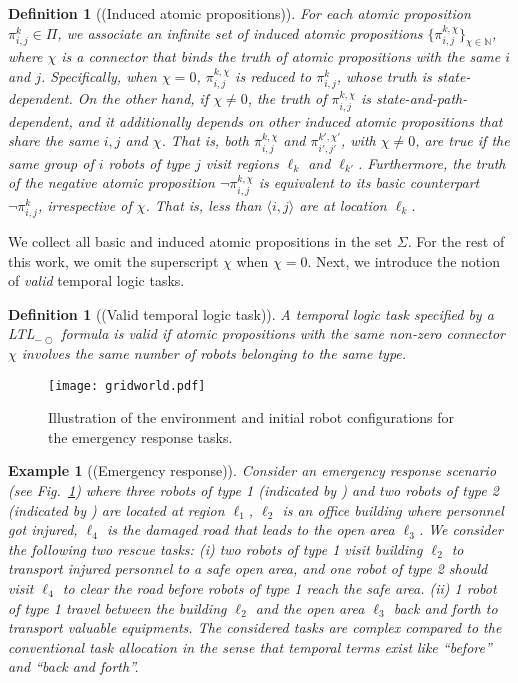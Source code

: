 \documentclass[Afour,sageh,times]{sagej}
\newtheorem{exmp}{Example}
\newtheorem{defn}[thm]{Definition}
\newcommand{\ltl}{ {\it LTL}$_{-\bigcirc}$ }
\newcommand{\ag}[2]{\langle#1,#2\rangle}
\renewcommand{\ap}[3]{\mathcal{\pi}_{{#1},{#2}}^{#3}}
\newlength\myheight
\newlength\mydepth
\newcommand*\inlinegraphics[1]{%
  \settototalheight\myheight{Xygp}%
  \settodepth\mydepth{Xygp}%
  \raisebox{-0.7\mydepth}{\texttt{[image: \#1]}}%
}
\begin{document}
\begin{defn}[(Induced atomic propositions)]
   For each atomic proposition $\ap{i}{j}{k} \in \Pi$, we associate an infinite set of  {induced} atomic propositions $\{\ap{i}{j}{k,\chi}\}_{\chi\in \mathbb{N}}$, where $\chi$ is a {\it connector} that binds the truth of  atomic propositions with the same $i$ and $j$. Specifically, when $\chi=0$, $\ap{i}{j}{k,\chi}$ is reduced to $\ap{i}{j}{k}$, whose truth is state-dependent. On the other hand, if $\chi \neq 0$, the truth of $\ap{i}{j}{k,\chi}$ is state-and-path-dependent, and it additionally depends on other induced atomic propositions that share the same $i,j$ and $\chi$. That is, both $\ap{i}{j}{k,\chi}$ and $\ap{i'}{j'}{k',\chi'}$, with $\chi\not=0$, are true if the same group of $i$ robots of type $j$ visit regions $\ell_k$ and $\ell_{k'}$. Furthermore, the truth of the negative atomic proposition  $\neg \ap{i}{j}{k,\chi}$ is equivalent to its basic counterpart $\neg \ap{i}{j}{k}$, irrespective of  $\chi$. That is, less than $\ag{i}{j}$ are at location $\ell_k$.
\end{defn}
We collect all basic and induced atomic propositions in the set $\Sigma$.  For the rest of this work, we omit the superscript $\chi$ when $\chi=0$. Next, we introduce the notion of {\it valid} temporal logic tasks.
 \begin{defn}[(Valid temporal logic task)]\label{defn:valid}
A temporal logic task specified by a\ltl formula is valid if atomic propositions with the same non-zero connector $\chi$ involves the same number of robots  belonging to the same type.
 \end{defn}

 \begin{figure}[!t]
    \centering
    \texttt{[image: gridworld.pdf]}
    \caption{Illustration of the environment and initial robot configurations for the emergency response tasks.}\label{fig:workspace}
\end{figure}
\begin{exmp}[(Emergency response)]\label{exmp:1}
 Consider an emergency response scenario (see Fig.~\ref{fig:workspace}) where three robots of type 1 (indicated by \inlinegraphics{star.pdf}) and two robots of type 2 (indicated by \inlinegraphics{bluedot.pdf}) are located at region $\ell_1$, $\ell_2$ is an office building where personnel got injured, $\ell_4$ is the damaged road that leads to the open area $\ell_3$. We consider the following two rescue tasks: {\it (i)} \label{task:i} two robots of type 1 visit building $\ell_2$ to transport injured personnel to a safe open area, and one robot of type 2 should visit $\ell_4$ to clear the road before robots of type 1 reach the safe area. {\it (ii)} \label{task:ii} 1 robot of type 1 travel between the building $\ell_2$ and the open area $\ell_3$ back and forth to transport valuable equipments. The considered tasks are complex compared to the conventional task allocation in the sense that temporal terms exist like ``before'' and ``back and forth''.

\end{exmp}
\end{document}
